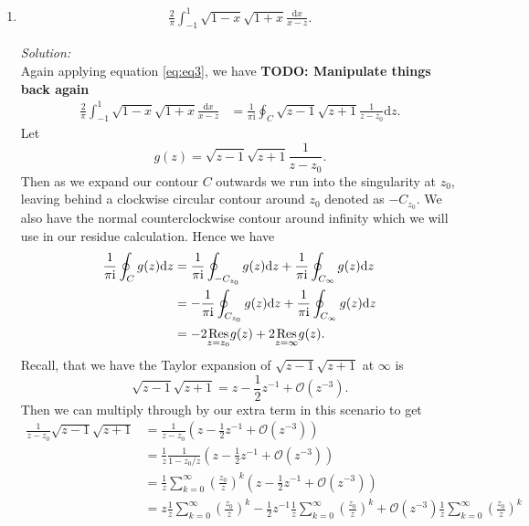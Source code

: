 \documentclass[10pt]{amsart}
\newcommand{\D}{\mathrm{d}}
\newcommand{\I}{\mathrm{i}}
\theoremstyle{nonumberplain}
\begin{document}
\begin{enumerate}[label={\bf {\arabic*}:}]
\begin{enumerate}
\newpage

\item 
\begin{align*}
\frac{2}{\pi}\int_{-1}^1 {\sqrt{1-x} \sqrt{1 + x}} \frac{\D x}{x -z}.
\end{align*}

\textit{Solution:} \\
Again applying equation \eqref{eq:eq3}, we have
\textbf{TODO: Manipulate things back again}
\begin{align*}
\frac{2}{\pi}\int_{-1}^1 {\sqrt{1-x} \sqrt{1 + x}} \frac{\D x}{x -z}
	&= \frac 1 {\pi \I} \oint_C \sqrt {z - 1} \sqrt {z + 1} \frac 1 {z - z_0} \D z.
\end{align*}
Let
$$g(z) = \sqrt {z - 1} \sqrt {z + 1} \frac 1 {z - z_0}.$$
Then as we expand our contour $C$ outwards we run into the singularity at $z_0$, leaving behind a clockwise circular contour around $z_0$ denoted as $-C_{z_0}$.
We also have the normal counterclockwise contour around infinity which we will use in our residue calculation.
Hence we have
\begin{align}
\frac 1 {\pi \I} \oint_C g(z) \D z
	&= \frac 1 {\pi \I} \oint_{-C_{z_0}} g(z) \D z + \frac 1 {\pi \I} \oint_{C_\infty} g(z) \D z \nonumber \\
	&= - \frac 1 {\pi \I} \oint_{C_{z_0}} g(z) \D z + \frac 1 {\pi \I} \oint_{C_\infty} g(z) \D z \nonumber \\
	&= - 2 \underset{z=z_0}{{\rm Res}} g(z) + 2 \underset{z=\infty}{{\rm Res}} g(z).
\label{eq:eq5}
\end{align}
Recall, that we have the Taylor expansion of $\sqrt {z - 1} \sqrt {z + 1}$ at $\infty$ is
$$
\sqrt {z - 1} \sqrt {z + 1} = z - \frac 1 2 z^{-1} + \mathcal O(z^{-3}).
$$
Then we can multiply through by our extra term in this scenario to get
\begin{align*}
\frac 1 {z - z_0}\sqrt {z - 1} \sqrt {z + 1} &= \frac 1 {z - z_0} \left(z - \frac 1 2 z^{-1} + \mathcal O(z^{-3})\right) \\
	&= \frac 1 z \frac 1 {1 - z_0/z} \left(z - \frac 1 2 z^{-1} + \mathcal O(z^{-3})\right) \\
	&= \frac 1 z \sum_{k = 0}^\infty \left(\frac {z_0} z\right)^k \left(z - \frac 1 2 z^{-1} + \mathcal O(z^{-3})\right) \\
	&=  z\frac 1 z \sum_{k = 0}^\infty \left(\frac {z_0} z\right)^k - \frac 1 2 z^{-1}\frac 1 z \sum_{k = 0}^\infty \left(\frac {z_0} z\right)^k + \mathcal O(z^{-3})\frac 1 z \sum_{k = 0}^\infty \left(\frac {z_0} z\right)^k \\

\end{align*}
\end{enumerate}
\end{enumerate}
\end{document}
